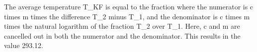 The average temperature T_KF is equal to the fraction where the numerator is c times m times the difference T_2 minus T_1, and the denominator is c times m times the natural logarithm of the fraction T_2 over T_1. Here, c and m are cancelled out in both the numerator and the denominator. This results in the value 293.12.